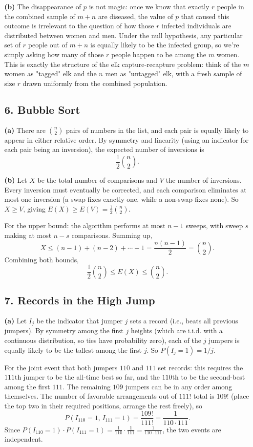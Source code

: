 \documentclass{article}
\begin{document}
\medskip
\textbf{(b)} The disappearance of $p$ is not magic: once we know that exactly $r$ people in the combined sample of $m+n$ are diseased, the value of $p$ that caused this outcome is irrelevant to the question of how those $r$ infected individuals are distributed between women and men. Under the null hypothesis, any particular set of $r$ people out of $m+n$ is equally likely to be the infected group, so we're simply asking how many of those $r$ people happen to be among the $m$ women. This is exactly the structure of the elk capture-recapture problem: think of the $m$ women as "tagged" elk and the $n$ men as "untagged" elk, with a fresh sample of size $r$ drawn uniformly from the combined population.

\subsection*{6. Bubble Sort}

\textbf{(a)} There are $\binom{n}{2}$ pairs of numbers in the list, and each pair is equally likely to appear in either relative order. By symmetry and linearity (using an indicator for each pair being an inversion), the expected number of inversions is
$$
\frac{1}{2}\binom{n}{2}.
$$

\medskip
\textbf{(b)} Let $X$ be the total number of comparisons and $V$ the number of inversions. Every inversion must eventually be corrected, and each comparison eliminates at most one inversion (a swap fixes exactly one, while a non-swap fixes none). So $X\ge V$, giving $E(X)\ge E(V)=\frac{1}{2}\binom{n}{2}$.

For the upper bound: the algorithm performs at most $n-1$ sweeps, with sweep $s$ making at most $n-s$ comparisons. Summing up,
$$
X\le(n-1)+(n-2)+\cdots+1=\frac{n(n-1)}{2}=\binom{n}{2}.
$$
Combining both bounds,
$$
\frac{1}{2}\binom{n}{2}\le E(X)\le\binom{n}{2}.
$$

\subsection*{7. Records in the High Jump}

\textbf{(a)} Let $I_j$ be the indicator that jumper $j$ sets a record (i.e., beats all previous jumpers). By symmetry among the first $j$ heights (which are i.i.d. with a continuous distribution, so ties have probability zero), each of the $j$ jumpers is equally likely to be the tallest among the first $j$. So $P(I_j=1)=1/j$.

For the joint event that both jumpers $110$ and $111$ set records: this requires the $111$th jumper to be the all-time best so far, and the $110$th to be the second-best among the first $111$. The remaining $109$ jumpers can be in any order among themselves. The number of favorable arrangements out of $111!$ total is $109!$ (place the top two in their required positions, arrange the rest freely), so
$$
P(I_{110}=1,\,I_{111}=1)=\frac{109!}{111!}=\frac{1}{110\cdot111}.
$$
Since $P(I_{110}=1)\cdot P(I_{111}=1)=\frac{1}{110}\cdot\frac{1}{111}=\frac{1}{110\cdot111}$, the two events are independent.
\end{document}
